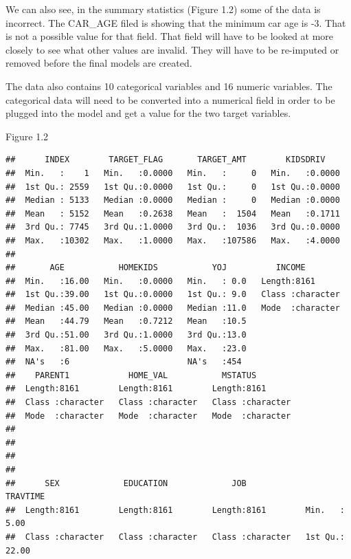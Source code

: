 \documentclass[]{article}
\begin{document}
We can also see, in the summary statistics (Figure 1.2) some of the data
is incorrect. The CAR\_AGE filed is showing that the minimum car age is
-3. That is not a possible value for that field. That field will have to
be looked at more closely to see what other values are invalid. They
will have to be re-imputed or removed before the final models are
created.

The data also contains 10 categorical variables and 16 numeric
variables. The categorical data will need to be converted into a
numerical field in order to be plugged into the model and get a value
for the two target variables.

Figure 1.2

\begin{verbatim}
##      INDEX        TARGET_FLAG       TARGET_AMT        KIDSDRIV     
##  Min.   :    1   Min.   :0.0000   Min.   :     0   Min.   :0.0000  
##  1st Qu.: 2559   1st Qu.:0.0000   1st Qu.:     0   1st Qu.:0.0000  
##  Median : 5133   Median :0.0000   Median :     0   Median :0.0000  
##  Mean   : 5152   Mean   :0.2638   Mean   :  1504   Mean   :0.1711  
##  3rd Qu.: 7745   3rd Qu.:1.0000   3rd Qu.:  1036   3rd Qu.:0.0000  
##  Max.   :10302   Max.   :1.0000   Max.   :107586   Max.   :4.0000  
##                                                                    
##       AGE           HOMEKIDS           YOJ          INCOME         
##  Min.   :16.00   Min.   :0.0000   Min.   : 0.0   Length:8161       
##  1st Qu.:39.00   1st Qu.:0.0000   1st Qu.: 9.0   Class :character  
##  Median :45.00   Median :0.0000   Median :11.0   Mode  :character  
##  Mean   :44.79   Mean   :0.7212   Mean   :10.5                     
##  3rd Qu.:51.00   3rd Qu.:1.0000   3rd Qu.:13.0                     
##  Max.   :81.00   Max.   :5.0000   Max.   :23.0                     
##  NA's   :6                        NA's   :454                      
##    PARENT1            HOME_VAL           MSTATUS         
##  Length:8161        Length:8161        Length:8161       
##  Class :character   Class :character   Class :character  
##  Mode  :character   Mode  :character   Mode  :character  
##                                                          
##                                                          
##                                                          
##                                                          
##      SEX             EDUCATION             JOB               TRAVTIME     
##  Length:8161        Length:8161        Length:8161        Min.   :  5.00  
##  Class :character   Class :character   Class :character   1st Qu.: 22.00  

\end{verbatim}
\end{document}
